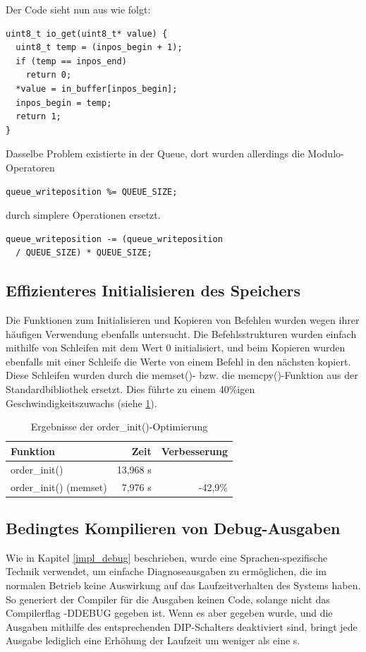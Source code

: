 Der Code sieht nun aus wie folgt:
\begin{verbatim}
uint8_t io_get(uint8_t* value) {
  uint8_t temp = (inpos_begin + 1);
  if (temp == inpos_end)
    return 0;
  *value = in_buffer[inpos_begin];
  inpos_begin = temp;
  return 1;
}
\end{verbatim}
Dasselbe Problem existierte in der Queue, dort wurden allerdings die Modulo-Operatoren
\begin{verbatim}
queue_writeposition %= QUEUE_SIZE;
\end{verbatim}
durch simplere Operationen ersetzt.
\begin{verbatim}
queue_writeposition -= (queue_writeposition
  / QUEUE_SIZE) * QUEUE_SIZE;
\end{verbatim}

\subsection{Effizienteres Initialisieren des Speichers}
Die Funktionen zum Initialisieren und Kopieren von Befehlen wurden wegen ihrer häufigen Verwendung ebenfalls
untersucht. Die Befehlsstrukturen wurden einfach mithilfe von Schleifen mit dem Wert 0 initialisiert, und beim
Kopieren wurden ebenfalls mit einer Schleife die Werte von einem Befehl in den nächsten kopiert. Diese Schleifen
wurden durch die memset()- bzw. die memcpy()-Funktion aus der Standardbibliothek ersetzt. Dies führte zu einem
40\%igen Geschwindigkeitszuwachs (siehe \ref{order_init_meas}).
\begin{table}[htb]
\begin{center}
	\begin{tabular}{|l||r|r|}
		\hline
		\textbf{Funktion} & \textbf{Zeit} & \textbf{Verbesserung} \\ \hline \hline
		order\_init() & 13,968 \textmu{}s & \\ \hline
		order\_init() (memset) & 7,976 \textmu{}s & -42,9\% \\ \hline
	\end{tabular}
	\caption{\label{order_init_meas} Ergebnisse der order\_init()-Optimierung}
\end{center}
\end{table}

\subsection{Bedingtes Kompilieren von Debug-Ausgaben}
Wie in Kapitel \ref{impl_debug} beschrieben, wurde eine Sprachen-spezifische Technik verwendet, um 
einfache Diagnoseausgaben zu ermöglichen, die im normalen Betrieb keine Auswirkung
auf das Laufzeitverhalten des Systems haben. So generiert der Compiler für die Ausgaben keinen Code, solange nicht
das Compilerflag -DDEBUG gegeben ist. Wenn es aber gegeben wurde, und die Ausgaben mithilfe des entsprechenden DIP-Schalters
deaktiviert sind, bringt jede Ausgabe lediglich eine Erhöhung der Laufzeit um weniger als eine \textmu{}s.

